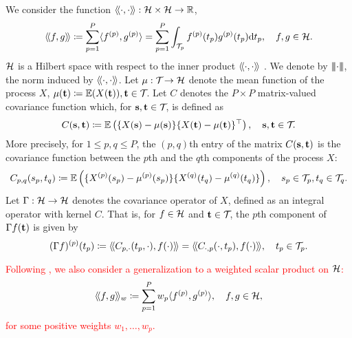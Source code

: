 We consider the function $\langle\!\langle\cdot, \cdot\rangle\!\rangle : \mathcal{H} \times \mathcal{H} \rightarrow \mathbb{R}$,
\begin{equation}\label{eq:innerprodH}
    \langle\!\langle f, g\rangle\!\rangle \coloneqq \sum_{p=1}^{P} \langle f^{(p)}, g^{(p)}\rangle = \sum_{p=1}^{P}\int_{\mathcal{T}_{p}} f^{(p)}(t_p)g^{(p)}(t_p) {\rm d} t_p, \quad f, g \in \mathcal{H}.
\end{equation}
$\mathcal{H}$ is a Hilbert space with respect to the inner product $\langle\!\langle\cdot, \cdot\rangle\!\rangle$ \cite{happMultivariateFunctionalPrincipal2015}. We denote by $\left|\!\left|\!\left|\cdot\right|\!\right|\!\right|$, the norm induced by $\langle\!\langle\cdot, \cdot\rangle\!\rangle$. Let $\mu : \mathcal{T}_{} \rightarrow \mathcal{H}$ denote the mean function of the process $X$, $\mu(\mathbf{t}) \coloneqq \mathbb{E}(X(\mathbf{t})), \mathbf{t} \in \mathcal{T}_{}$. Let $C$ denotes the $P \times P$ matrix-valued covariance function which, for $\mathbf{s}, \mathbf{t} \in \mathcal{T}_{}$, is defined as
\begin{equation}\label{eq:covariance_function}
    C(\mathbf{s}, \mathbf{t}) \coloneqq \mathbb{E}\left(\{X(\mathbf{s}) - \mu(\mathbf{s})\}\{X(\mathbf{t}) - \mu(\mathbf{t})\}^{\top}\right), \quad \mathbf{s}, \mathbf{t} \in \mathcal{T}_{}.
\end{equation}
More precisely, for $1 \leq p, q \leq P$, the $(p, q)$th entry of the matrix $C(\mathbf{s}, \mathbf{t})$ is the covariance function between the $p$th and the $q$th components of the process $X$:
\begin{equation}\label{eq:covariance_function_components}
    C_{p, q}(s_p, t_q) \coloneqq \mathbb{E}\left(\{X^{(p)}(s_p) - \mu^{(p)}(s_p)\}\{X^{(q)}(t_q) - \mu^{(q)}(t_q)\}\right), \quad s_p \in \mathcal{T}_{p}, t_q \in \mathcal{T}_{q}.
\end{equation}
Let $\Gamma : \mathcal{H} \rightarrow \mathcal{H}$ denotes the covariance operator of $X$, defined as an integral operator with kernel $C$. That is, for $f \in \mathcal{H}$ and $\mathbf{t} \in \mathcal{T}_{}$, the $p$th component of $\Gamma f(\mathbf{t})$ is given by
\begin{equation}\label{eq:covariance_operator_components}
    (\Gamma f)^{(p)}(t_p) \coloneqq \langle\!\langle C_{p, \cdot}(t_p, \cdot), f(\cdot)\rangle\!\rangle = \langle\!\langle C_{\cdot, p}(\cdot, t_p), f(\cdot)\rangle\!\rangle, \quad t_p \in \mathcal{T}_{p}.
\end{equation}

\textcolor{red}{
Following \cite{happMultivariateFunctionalPrincipal2015}, we also consider a generalization to a weighted scalar product on $\mathcal{H}$:
\begin{equation}\label{eq:innerprodH_w}
    \langle\!\langle f, g\rangle\!\rangle_w \coloneqq \sum_{p=1}^{P} w_p\langle f^{(p)}, g^{(p)}\rangle, \quad f, g \in \mathcal{H},
\end{equation}  
for some positive weights $w_1, \dots, w_p$.}

